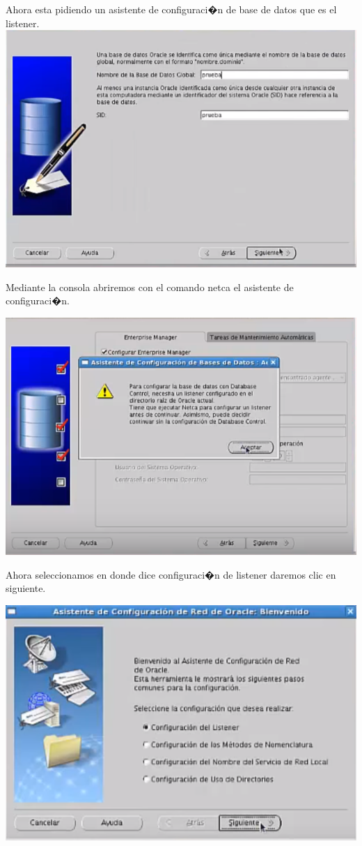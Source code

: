\documentclass[12pt,letterpaper]{article}
\begin{document}
\begin{center}
Ahora esta pidiendo un asistente de configuraci�n de base de datos que es el listener.\\
\includegraphics[width=15cm]{oraclelinux/32.png}
\end{center}
Mediante la consola abriremos con el comando netca el asistente de configuraci�n.\\
\begin{center}
	\includegraphics[width=15cm]{oraclelinux/33.png}
\end{center}
Ahora seleccionamos en donde dice configuraci�n de listener daremos clic en siguiente. \\
\begin{center}
	\includegraphics[width=15cm]{oraclelinux/34.png}
\end{center}
\end{document}

